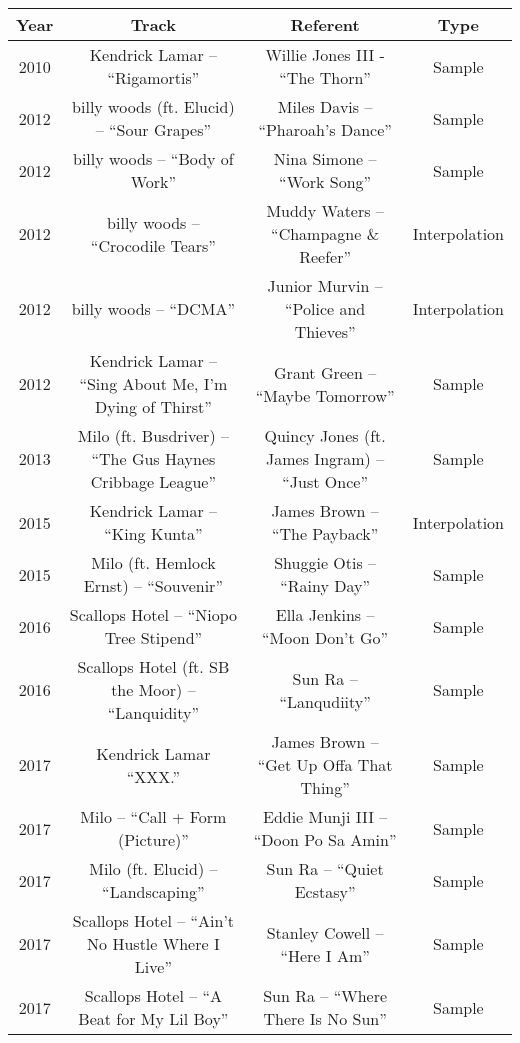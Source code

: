 \begin{sidewaystable}[p]
    \centering
    \small
    \begin{tabular}{|c|c|c|c|}
         \hline
        Year & Track & Referent & Type \\ \hline
        2010 & Kendrick Lamar -- ``Rigamortis'' & Willie Jones III - ``The Thorn'' & Sample \\ \hline 
        2012 & billy woods (ft. Elucid) -- ``Sour Grapes'' & Miles Davis -- ``Pharoah's Dance'' & Sample \\ \hline
        2012 & billy woods -- ``Body of Work'' & Nina Simone -- ``Work Song'' & Sample \\ \hline
        2012 & billy woods -- ``Crocodile Tears'' & Muddy Waters -- ``Champagne \& Reefer'' & Interpolation \\ \hline
        2012 & billy woods -- ``DCMA'' & Junior Murvin -- ``Police and Thieves'' & Interpolation \\ \hline
        2012 & Kendrick Lamar -- ``Sing About Me, I'm Dying of Thirst'' & Grant Green -- ``Maybe Tomorrow'' & Sample \\ \hline
        2013 & Milo (ft. Busdriver) -- ``The Gus Haynes Cribbage League'' & Quincy Jones (ft. James Ingram) -- ``Just Once'' & Sample \\ \hline
        2015 & Kendrick Lamar -- ``King Kunta'' & James Brown -- ``The Payback'' & Interpolation \\ \hline
        2015 & Milo (ft. Hemlock Ernst) -- ``Souvenir'' & Shuggie Otis -- ``Rainy Day'' & Sample \\ \hline
        2016 & Scallops Hotel -- ``Niopo Tree Stipend'' & Ella Jenkins -- ``Moon Don't Go'' & Sample \\ \hline
        2016 & Scallops Hotel (ft. SB the Moor) -- ``Lanquidity'' & Sun Ra -- ``Lanqudiity'' & Sample \\ \hline
        2017 & Kendrick Lamar ``XXX.'' & James Brown -- ``Get Up Offa That Thing'' & Sample \\ \hline
        2017 & Milo -- ``Call + Form (Picture)'' & Eddie Munji III -- ``Doon Po Sa Amin'' & Sample \\ \hline
        2017 & Milo (ft. Elucid) -- ``Landscaping'' & Sun Ra -- ``Quiet Ecstasy'' & Sample \\ \hline
        2017 & Scallops Hotel -- ``Ain't No Hustle Where I Live'' & Stanley Cowell -- ``Here I Am'' & Sample \\ \hline
        2017 & Scallops Hotel -- ``A Beat for My Lil Boy'' & Sun Ra -- ``Where There Is No Sun'' & Sample \\ \hline

\end{tabular}
\end{sidewaystable}

